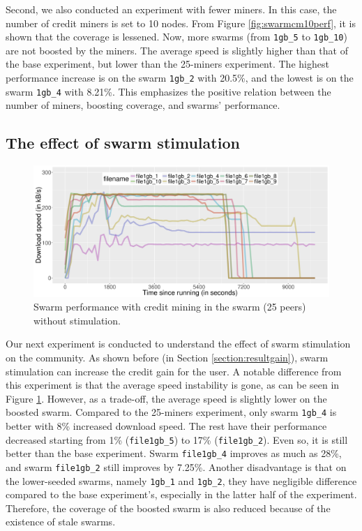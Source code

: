 Second, we also conducted an experiment with fewer miners. In this case, the number of credit miners is set to 10 nodes. From Figure \ref{fig:swarmcm10perf}, it is shown that the coverage is lessened. Now, more swarms (from \texttt{1gb\_5} to \texttt{1gb\_10}) are not boosted by the miners. The average speed is slightly higher than that of the base experiment, but lower than the 25-miners experiment. The highest performance increase is on the swarm \texttt{1gb\_2} with 20.5\%, and the lowest is on the swarm \texttt{1gb\_4} with 8.21\%. This emphasizes the positive relation between the number of miners, boosting coverage, and swarms' performance.


\subsection{The effect of swarm stimulation}
\begin{figure}[h!]
	\centering
	\includegraphics[width=\textwidth]{pics/results/swperf_sc1_notrig.png}
	\caption{Swarm performance with credit mining in the swarm (25 peers) without stimulation.}
	\label{fig:swarmcm25perfnotrig}
\end{figure}

Our next experiment is conducted to understand the effect of swarm stimulation on the community. As shown before (in Section \ref{section:resultgain}), swarm stimulation can increase the credit gain for the user. A notable difference from this experiment is that the average speed instability is gone, as can be seen in Figure \ref{fig:swarmcm25perfnotrig}. However, as a trade-off, the average speed is slightly lower on the boosted swarm. Compared to the 25-miners experiment, only swarm \texttt{1gb\_4} is better with 8\% increased download speed. The rest have their performance decreased starting from 1\% (\texttt{file1gb\_5}) to 17\% (\texttt{file1gb\_2}). Even so, it is still better than the base experiment. Swarm \texttt{file1gb\_4} improves as much as 28\%, and swarm \texttt{file1gb\_2} still improves by 7.25\%. Another disadvantage is that on the lower-seeded swarms, namely \texttt{1gb\_1} and \texttt{1gb\_2}, they have negligible difference compared to the base experiment's, especially in the latter half of the experiment. Therefore, the coverage of the boosted swarm is also reduced because of the existence of stale swarms. 

